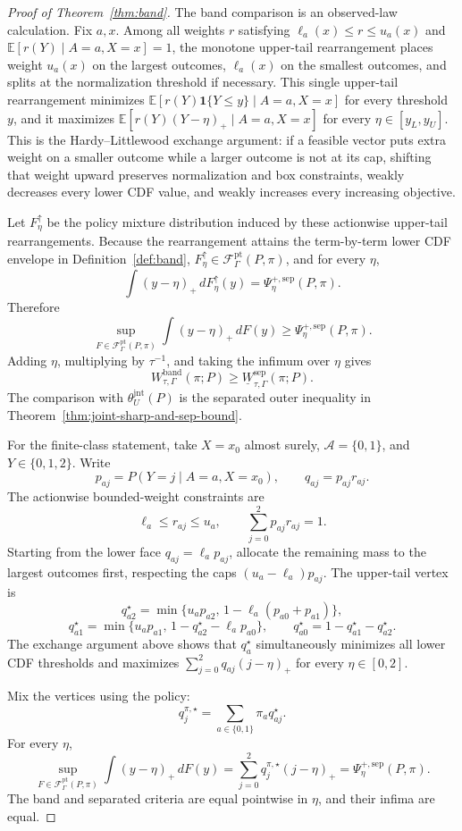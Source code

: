 \documentclass[11pt]{article}
\newcommand{\E}{\mathbb{E}}
\newcommand{\one}{\mathbf{1}}
\newcommand{\calF}{\mathcal{F}}
\theoremstyle{definition}
\theoremstyle{plain}
\theoremstyle{remark}
\begin{document}
\begin{proof}[Proof of Theorem~\ref{thm:band}]
The band comparison is an observed-law calculation.  Fix \(a,x\).  Among all
weights \(r\) satisfying
\(\ell_a(x)\le r\le u_a(x)\) and
\(\E[r(Y)\mid A=a,X=x]=1\), the monotone upper-tail rearrangement places
weight \(u_a(x)\) on the largest outcomes, \(\ell_a(x)\) on the smallest
outcomes, and splits at the normalization threshold if necessary.  This single
upper-tail rearrangement minimizes
\(\E[r(Y)\one\{Y\le y\}\mid A=a,X=x]\) for every threshold \(y\), and it
maximizes \(\E[r(Y)(Y-\eta)_+\mid A=a,X=x]\) for every
\(\eta\in[y_L,y_U]\).  This is the Hardy--Littlewood exchange argument:
if a feasible vector puts extra weight on a smaller outcome while a larger
outcome is not at its cap, shifting that weight upward preserves normalization
and box constraints, weakly decreases every lower CDF value, and weakly
increases every increasing objective.

Let \(F_\eta^\uparrow\) be the policy mixture distribution induced by these
actionwise upper-tail rearrangements.  Because the rearrangement attains the
term-by-term lower CDF envelope in Definition~\ref{def:band},
\(F_\eta^\uparrow\in\calF_\Gamma^{\mathrm{pt}}(P,\pi)\), and for every
\(\eta\),
\[
\int (y-\eta)_+\,dF_\eta^\uparrow(y)
=
\Psi_\eta^{+,\mathrm{sep}}(P,\pi).
\]
Therefore
\[
\sup_{F\in\calF_\Gamma^{\mathrm{pt}}(P,\pi)}
\int (y-\eta)_+\,dF(y)
\ge
\Psi_\eta^{+,\mathrm{sep}}(P,\pi).
\]
Adding \(\eta\), multiplying by \(\tau^{-1}\), and taking the infimum over
\(\eta\) gives
\[
W_{\tau,\Gamma}^{\mathrm{band}}(\pi;P)
\ge
\underline W_{\tau,\Gamma}^{\mathrm{sep}}(\pi;P).
\]
The comparison with \(\theta_U^{\mathrm{jnt}}(P)\) is the separated outer
inequality in Theorem~\ref{thm:joint-sharp-and-sep-bound}.

For the finite-class statement, take \(X=x_0\) almost surely,
\(\mathcal A=\{0,1\}\), and \(Y\in\{0,1,2\}\).  Write
\[
p_{aj}=P(Y=j\mid A=a,X=x_0),
\qquad
q_{aj}=p_{aj}r_{aj}.
\]
The actionwise bounded-weight constraints are
\[
\ell_a\le r_{aj}\le u_a,
\qquad
\sum_{j=0}^2 p_{aj}r_{aj}=1.
\]
Starting from the lower face \(q_{aj}=\ell_a p_{aj}\), allocate the remaining
mass to the largest outcomes first, respecting the caps
\((u_a-\ell_a)p_{aj}\).  The upper-tail vertex is
\[
q^\star_{a2}=\min\{u_ap_{a2},\,1-\ell_a(p_{a0}+p_{a1})\},
\]
\[
q^\star_{a1}=\min\{u_ap_{a1},\,1-q^\star_{a2}-\ell_ap_{a0}\},
\qquad
q^\star_{a0}=1-q^\star_{a1}-q^\star_{a2}.
\]
The exchange argument above shows that \(q_a^\star\) simultaneously minimizes
all lower CDF thresholds and maximizes
\(\sum_{j=0}^2 q_{aj}(j-\eta)_+\) for every \(\eta\in[0,2]\).

Mix the vertices using the policy:
\[
q^{\pi,\star}_j=\sum_{a\in\{0,1\}}\pi_a q^\star_{aj}.
\]
For every \(\eta\),
\[
\sup_{F\in\calF_\Gamma^{\mathrm{pt}}(P,\pi)}
\int (y-\eta)_+\,dF(y)
=
\sum_{j=0}^2 q^{\pi,\star}_j(j-\eta)_+
=
\Psi_\eta^{+,\mathrm{sep}}(P,\pi).
\]
The band and separated criteria are equal pointwise in \(\eta\), and their
infima are equal.
\end{proof}
\end{document}
